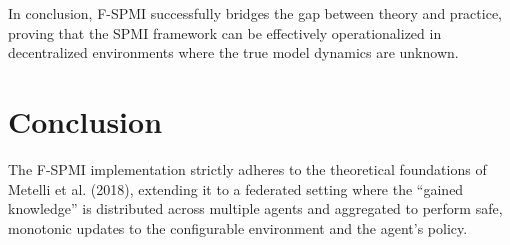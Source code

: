 \documentclass{article}
\begin{document}
In conclusion, F-SPMI successfully bridges the gap between theory and practice, proving that the SPMI framework can be effectively operationalized in decentralized environments where the true model dynamics are unknown.

\section{Conclusion}
The F-SPMI implementation strictly adheres to the theoretical foundations of Metelli et al. (2018), extending it to a federated setting where the ``gained knowledge'' is distributed across multiple agents and aggregated to perform safe, monotonic updates to the configurable environment and the agent's policy.
\end{document}
